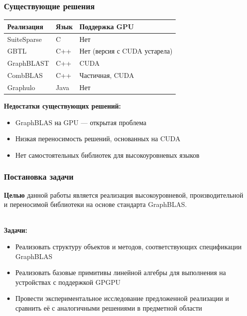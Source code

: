 \documentclass{beamer}
\begin{document}
\begin{frame}  
  \frametitle{Существующие решения}
  \begin{table}[htbp]
    \begin{tabularx}{\textwidth}{X|X|l}
      Реализация & Язык & Поддержка GPU \\
      \hline
      SuiteSparse & C & Нет \\
      GBTL & C++ & Нет (версия с CUDA устарела) \\
      GraphBLAST & C++ & CUDA \\
      CombBLAS & C++ & Частичная, CUDA \\
      Graphulo & Java & Нет \\ 
      \hline
    \end{tabularx}
  \end{table}
  
  \bigskip
  \textbf{Недостатки существующих решений:}
  \begin{itemize}
    \item GraphBLAS на GPU --- открытая проблема
  	\item Низкая переносимость решений, основанных на CUDA
    \item Нет самостоятельных библиотек для высокоуровневых языков
  \end{itemize}
\end{frame}

\begin{frame}
  \frametitle{Постановка задачи}
  \textbf{Целью} данной работы является реализация высокоуровневой, производительной и переносимой библиотеки на основе стандарта GraphBLAS.
  
  ~\\
  \textbf{Задачи:}
  \begin{itemize}
    \item Реализовать структуру объектов и методов, соответствующих спецификации GraphBLAS
    \item Реализовать базовые примитивы линейной алгебры для выполнения на устройствах с поддержкой GPGPU
    \item Провести экспериментальное исследование предложенной реализации и сравнить её с аналогичными решениями в предметной области
  \end{itemize}
\end{frame}
\end{document}
